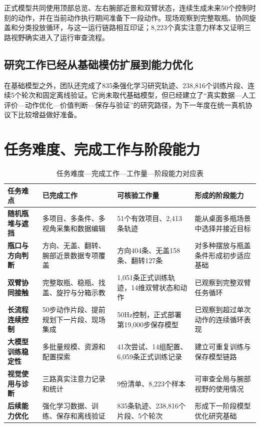 正式模型共同使用顶部总览、左右腕部近景和双臂状态，连续生成未来50个控制时刻的动作，并在当前动作执行期间准备下一段动作。现场观察到完整取瓶、协同旋盖和分类投放循环，与这一运行链路相互印证；8,223个真实注意力样本又证明三路视野确实进入了运行审查流程。

\subsection{研究工作已经从基础模仿扩展到能力优化}

在基础模型之外，团队还完成了835条强化学习研究轨迹、238,816个训练片段、连续5个轮次和固定离线验证。它尚未取代基础模型，但已经建立了“真实数据—人工评价—动作优化—价值判断—保存与验证”的研究路径，为下一年度在统一真机协议下比较增益做好准备。

\section{任务难度、完成工作与阶段能力}

\begin{table}[H]
\centering
\caption{任务难度—完成工作—工作量—阶段能力对应表}
\begin{tabularx}{\textwidth}{>{\bfseries}p{25mm}p{39mm}p{36mm}X}
\toprule
任务难点 & 已完成工作 & 可核验工作量 & 形成的阶段能力\\
\midrule
随机瓶堆与遮挡 & 多项目、多条件、多视角采集和数据编辑 & 51个有效项目、2,413条轨迹 & 能从桌面多瓶场景中选择并接近目标\\
瓶口与方向判断 & 方向、无盖、翻转、腕部近景数据专项覆盖 & 方向404条、无盖158条、翻转127条 & 对多种摆放与瓶盖条件形成初步适应基础\\
双臂协同接触 & 完整取瓶、稳瓶、找盖、旋拧与分箱示教 & 1,051条正式训练轨迹，14维双臂状态和动作 & 已观察到完整双臂任务循环\\
长流程连续控制 & 50步动作片段、提前规划下一片段、现场集成 & 50Hz控制，正式部署第19,000步保存模型 & 已观察到超过单次动作的连续循环表现\\
大模型训练稳定性 & 多批量规模、资源和配置探索 & 41次尝试、14组配置、6,059条正式训练记录 & 建立可重复训练与保存模型链路\\
视觉使用与诊断 & 三路真实注意力记录和统计 & 9份清单、8,223个样本 & 可审查全局与腕部视野的使用情况\\
后续能力优化 & 强化学习数据、训练、保存和离线验证 & 835条轨迹、238,816个片段、5个轮次 & 形成下一阶段模型优化研究基础\\
\bottomrule
\end{tabularx}
\end{table}

